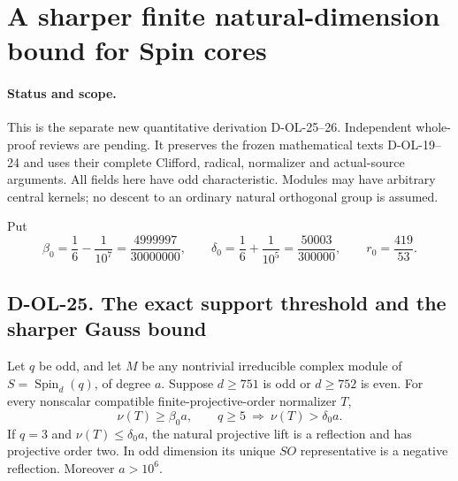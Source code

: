 \section{A sharper finite natural-dimension bound for Spin cores}
\label{sec:spin-sharpened}

\paragraph{Status and scope.}
This is the separate new quantitative derivation D-OL-25--26.
Independent whole-proof reviews are pending.  It preserves the
frozen mathematical texts D-OL-19--24 and uses their complete
Clifford, radical, normalizer and actual-source arguments.
All fields here have odd characteristic.  Modules may have
arbitrary central kernels; no descent to an ordinary natural
orthogonal group is assumed.

Put
\[
 \beta_0=\frac16-\frac1{10^7}
         =\frac{4999997}{30000000},\qquad
 \delta_0=\frac16+\frac1{10^5}
         =\frac{50003}{300000},\qquad r_0=\frac{419}{53}.
 \tag{SSP.1}
\]

\subsection*{D-OL-25. The exact support threshold and the sharper Gauss bound}

\begin{lemma}[D-OL-25]
Let $q$ be odd, and let $M$ be any nontrivial irreducible complex
module of $S=\operatorname{Spin}_d(q)$, of degree $a$.
Suppose $d\ge751$ is odd or $d\ge752$ is even.
For every nonscalar compatible finite-projective-order normalizer $T$,
\[
 \nu(T)\ge\beta_0a,
 \qquad q\ge5\ \Longrightarrow\ \nu(T)>\delta_0a.
 \tag{SSP.2}
\]
If $q=3$ and $\nu(T)\le\delta_0a$, the natural projective
lift is a reflection and has projective order two.
In odd dimension its unique $SO$ representative is a negative
reflection.  Moreover $a>10^6$.
\end{lemma}


